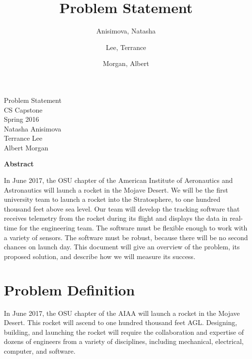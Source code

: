 \documentclass[10pt,journal,draftclsnofoot,onecolumn]{IEEEtran}
\begin{document}
	\singlespace
	
	\title{\vspace{2in}Problem Statement}
	
	\author {
		Anisimova, Natasha
		\and
		Lee, Terrance
		\and
		Morgan, Albert
	}
	
	
	\pagestyle{empty}
	\vspace*{2in}
	\begin{center}
		\huge
		Problem Statement\\
		\normalsize
		\vspace{5mm}
		CS Capstone\\
		Spring 2016\\
		\vspace{5mm}
		Natasha Anisimova\\
		Terrance Lee\\
		Albert Morgan
	\end{center}
	
	\vspace{5mm}
	
	\begin{center}
		\textbf{Abstract}
	\end{center}
	
	\begin{adjustwidth}{2in}{2in}
		In June 2017, the \ac{OSU} chapter of the
		American Institute of Aeronautics and Astronautics will launch a rocket in the Mojave Desert.
		We will be the first university team to launch a rocket into the Stratosphere, to one hundred thousand feet above 
		sea level.
		Our team will develop the tracking software that receives
		telemetry from the rocket during its flight
		and displays the data in real-time for the engineering team.
		The software must be flexible enough to work with a variety of sensors.
		The software must be robust,
		because there will be no second chances on launch day.
		This document will give an overview of the problem,
		its proposed solution,
		and describe how we will measure its success.
	\end{adjustwidth}
	
	\newpage
	\pagestyle{headings}
	\section{Problem Definition}
	In June 2017, the \ac{OSU} chapter of the
	\ac{AIAA} will launch a rocket in the Mojave Desert.
	This rocket will ascend to one hundred thousand feet \ac{AGL}.
	Designing, building, and launching the rocket will require the
	collaboration and expertise of dozens of engineers from a variety
	of disciplines, including mechanical, electrical, computer, and
	software.
	
\end{document}
